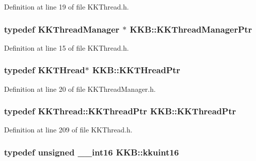 Definition at line 19 of file K\+K\+Thread.\+h.

\subsubsection[{\texorpdfstring{K\+K\+Thread\+Manager\+Ptr}{KKThreadManagerPtr}}]{\setlength{\rightskip}{0pt plus 5cm}typedef {\bf K\+K\+Thread\+Manager} $\ast$ {\bf K\+K\+B\+::\+K\+K\+Thread\+Manager\+Ptr}}\hypertarget{namespace_k_k_b_a9373d6bd6f2977b14e92c9e8e5ec4cdc}{}\label{namespace_k_k_b_a9373d6bd6f2977b14e92c9e8e5ec4cdc}


Definition at line 15 of file K\+K\+Thread.\+h.

\subsubsection[{\texorpdfstring{K\+K\+T\+Hread\+Ptr}{KKTHreadPtr}}]{\setlength{\rightskip}{0pt plus 5cm}typedef K\+K\+T\+Hread$\ast$ {\bf K\+K\+B\+::\+K\+K\+T\+Hread\+Ptr}}\hypertarget{namespace_k_k_b_a48df1bb0949527c9afc3535d86b8b138}{}\label{namespace_k_k_b_a48df1bb0949527c9afc3535d86b8b138}


Definition at line 20 of file K\+K\+Thread\+Manager.\+h.

\subsubsection[{\texorpdfstring{K\+K\+Thread\+Ptr}{KKThreadPtr}}]{\setlength{\rightskip}{0pt plus 5cm}typedef {\bf K\+K\+Thread\+::\+K\+K\+Thread\+Ptr} {\bf K\+K\+B\+::\+K\+K\+Thread\+Ptr}}\hypertarget{namespace_k_k_b_a777246973c170048c5d7aca8a7df3e42}{}\label{namespace_k_k_b_a777246973c170048c5d7aca8a7df3e42}


Definition at line 209 of file K\+K\+Thread.\+h.

\subsubsection[{\texorpdfstring{kkuint16}{kkuint16}}]{\setlength{\rightskip}{0pt plus 5cm}typedef unsigned \+\_\+\+\_\+int16 {\bf K\+K\+B\+::kkuint16}}\hypertarget{namespace_k_k_b_aa8c7d4d30381c8a0b6fce68974a9c8a9}{}\label{namespace_k_k_b_aa8c7d4d30381c8a0b6fce68974a9c8a9}


